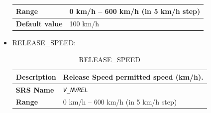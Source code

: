 \documentclass{template/openetcs}
\begin{document}
\begin{itemize}
\begin{longtable}{|l|l|}
				\hline
														
					\begin{minipage}[t]{0.22\linewidth} \textbf{Range}	\end{minipage} 
				&	\begin{minipage}[t]{0.78\linewidth} 0 km/h – 600 km/h (in 5 km/h step) \end{minipage} \\
				
				\hline
										
					\begin{minipage}[t]{0.22\linewidth} \textbf{Default value}	\end{minipage} 
				&	\begin{minipage}[t]{0.78\linewidth} 100 km/h \end{minipage} \\
				
				\hline
				
			\end{longtable}
						
			
			
		\item RELEASE\_SPEED:
		
			\begin{longtable}{|l|l|}
				\caption{RELEASE\_SPEED}\\ 												
				\hline
				
					\begin{minipage}[t]{0.22\linewidth} \textbf{Description}	\end{minipage} 
				&	\begin{minipage}[t]{0.78\linewidth} Release Speed permitted speed (km/h). \end{minipage} \\
				
				\hline
				
					\begin{minipage}[t]{0.22\linewidth} \textbf{SRS Name}	\end{minipage} 
				&	\begin{minipage}[t]{0.78\linewidth} \emph{\texttt{V\_NVREL}} \end{minipage} \\
				
				\hline
														
					\begin{minipage}[t]{0.22\linewidth} \textbf{Range}	\end{minipage} 
				&	\begin{minipage}[t]{0.78\linewidth} 0 km/h – 600 km/h (in 5 km/h step) \end{minipage} \\
				

\end{longtable}
\end{itemize}
\end{document}

